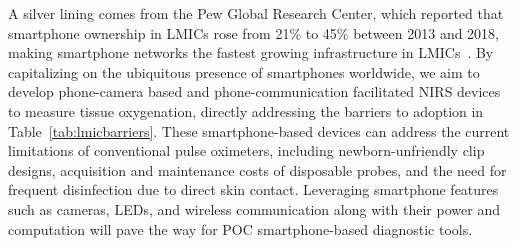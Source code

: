 A silver lining comes from the Pew Global Research Center, which reported that smartphone ownership in \ac{LMIC}s rose from 21\% to 45\% between 2013 and 2018, making smartphone networks the fastest growing infrastructure in LMICs~\cite{Poushter2016}. By capitalizing on the ubiquitous presence of smartphones worldwide, we aim to develop phone-camera based and phone-communication facilitated NIRS devices to measure tissue oxygenation, directly addressing the barriers to adoption in Table~\ref{tab:lmicbarriers}. These smartphone-based devices can address the current limitations of conventional pulse oximeters, including newborn-unfriendly clip designs, acquisition and maintenance costs of disposable probes, and the need for frequent disinfection due to direct skin contact. Leveraging smartphone features such as cameras, LEDs, and wireless communication along with their power and computation will pave the way for POC smartphone-based diagnostic tools. 

